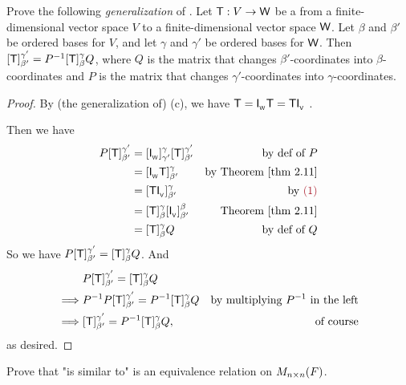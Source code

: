 \begin{exercise} \label{exercise 2.5.8}
Prove the following \emph{generalization} of .
Let \(\textsf{T} : V \to \textsf{W}\) be a \LTRAN{} from a finite-dimensional vector space \(V\) to a finite-dimensional vector space \(\textsf{W}\).
Let \(\beta\) and \(\beta'\) be ordered bases for \(V\), and let \(\gamma\) and \(\gamma'\) be ordered bases for \(\textsf{W}\).
Then \([\textsf{T}]_{\beta'}^{\gamma'} = P^{-1} [\textsf{T}]_{\beta}^{\gamma} Q\), where \(Q\) is the matrix that changes \(\beta'\)-coordinates into \(\beta\)-coordinates and \(P\) is the matrix that changes \(\gamma'\)-coordinates into \(\gamma\)-coordinates.
\end{exercise}

\begin{proof}
By (the generalization of) (c), we have \(\textsf{T} = \textsf{I}_{_{\textsf{W}}} \textsf{T} = \textsf{T} \textsf{I}_{_{\textsf{V}}}\) .

Then we have
\begin{align*}
    P [\T]_{\beta'}^{\gamma'}
        & = [\ITRANW]_{\gamma'}^{\gamma} [\T]_{\beta'}^{\gamma'} & \text{by def of \(P\)} \\
        & = [\ITRANW\T]_{\beta'}^{\gamma} & \text{by \THM{2.11}} \\
        & = [\T\ITRANV]_{\beta'}^{\gamma} & \text{by \MAROON{(1)}} \\
        & = [\T]_{\beta}^{\gamma} [\ITRANV]_{\beta'}^{\beta} & \text{\THM{2.11}} \\
        & = [\T]_{\beta}^{\gamma} Q & \text{by def of \(Q\)}
\end{align*}
So we have \(P [\textsf{T}]_{\beta'}^{\gamma'} = [\textsf{T}]_{\beta}^{\gamma} Q\).
And
\begin{align*}
             & P [\textsf{T}]_{\beta'}^{\gamma'} = [\textsf{T}]_{\beta}^{\gamma} Q \\
    \implies & P^{-1} P [\textsf{T}]_{\beta'}^{\gamma'} = P^{-1} [\textsf{T}]_{\beta}^{\gamma} Q & \text{by multiplying \(P^{-1}\) in the left} \\
    \implies & [\textsf{T}]_{\beta'}^{\gamma'} = P^{-1} [\textsf{T}]_{\beta}^{\gamma} Q, & \text{of course}
\end{align*}
as desired.
\end{proof}

\begin{exercise} \label{exercise 2.5.9}
Prove that "is similar to" is an equivalence relation on \(M_{n \times n}(F)\).
\end{exercise}

